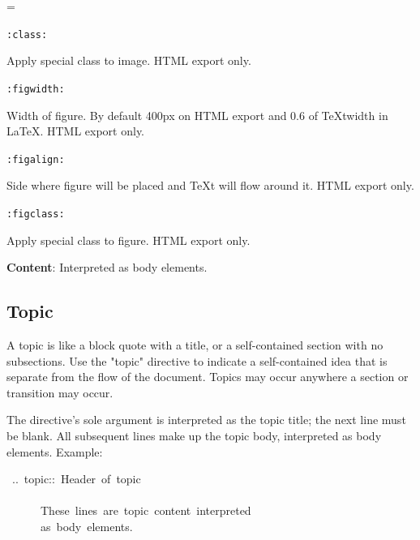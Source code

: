 \documentclass[12pt]{article}
\newenvironment{deflist}[1]{%
\begin{list}{}
{\renewcommand{\makelabel}[1]{\textbf{##1}\hfill}
\settowidth{\labelwidth}{\textbf{#1}}
\leftmargin=\labelwidth
\advance \leftmargin\labelsep}}
{\end{list}}
\begin{document}
\begin{itemize}
\begin{deflist}{iii}
 \begin{center}
\end{center}

\item[ \texttt{:class:}]

Apply special class to image. HTML export only.

\item[ \texttt{:figwidth:}]

Width of figure. By default 400px on HTML export and 0.6 of \TeX{}twidth
in \LaTeX{}. HTML export only.

\item[ \texttt{:figalign:}]

Side where figure will be placed and \TeX{}t will flow around it. HTML
export only.

\item[ \texttt{:figclass:}]

Apply special class to figure. HTML export only.
\end{deflist}

\item
\textbf{Content}: Interpreted as body elements.
\end{itemize}
\hypertarget{ltopic}{}
\subsection{Topic}

A topic is like a block quote with a title, or a self-contained section with
no subsections. Use the "topic" directive to indicate a self-contained idea
that is separate from the flow of the document. Topics may occur anywhere
a section or transition may occur.

The directive's sole argument is interpreted as the topic title; the next line
must be blank. All subsequent lines make up the topic body, interpreted as
body elements. Example:

\begin{ttfamily}\begin{flushleft}
\mbox{~..~topic::~Header~of~topic}\\
\mbox{}\\
\mbox{~~~~~~These~lines~are~topic~content~interpreted}\\
\mbox{~~~~~~as~body~elements.}\\
\end{flushleft}\end{ttfamily}
\end{document}
